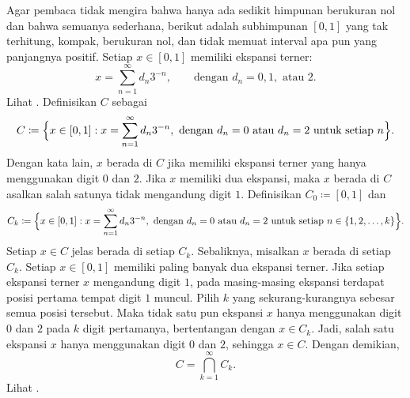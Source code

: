 \begin{example} \label{example:cantor}
Agar pembaca tidak mengira bahwa hanya ada sedikit himpunan berukuran nol dan
bahwa semuanya sederhana, berikut adalah subhimpunan $[0,1]$ yang tak
terhitung, kompak, berukuran nol, dan tidak memuat interval apa pun yang
panjangnya positif. Setiap $x\in[0,1]$ memiliki ekspansi terner:
\begin{equation*}
x = \sum_{n=1}^\infty d_n 3^{-n} ,
\qquad \text{dengan } d_n=0, 1, \text{ atau } 2.
\end{equation*}
Lihat . Definisikan
\emph{} $C$ sebagai
\begin{equation*}
C \coloneqq \Bigl\{ x \in [0,1] : x = \sum_{n=1}^\infty d_n 3^{-n},
\text{ dengan } d_n = 0 \text{ atau } d_n = 2
\text{ untuk setiap } n \Bigr\} .
\end{equation*}
Dengan kata lain, $x$ berada di $C$ jika memiliki ekspansi terner yang hanya
menggunakan digit $0$ dan $2$. Jika $x$ memiliki dua ekspansi, maka $x$ berada
di $C$ asalkan salah satunya tidak mengandung digit $1$. Definisikan
$C_0\coloneqq[0,1]$ dan
\begin{equation*}
C_k \coloneqq \Bigl\{ x \in [0,1] : x = \sum_{n=1}^\infty d_n 3^{-n},
\text{ dengan } d_n = 0 \text{ atau } d_n = 2
\text{ untuk setiap } n\in\{1,2,\ldots,k\} \Bigr\} .
\end{equation*}
Setiap $x\in C$ jelas berada di setiap $C_k$. Sebaliknya, misalkan $x$ berada
di setiap $C_k$. Setiap $x\in[0,1]$ memiliki paling banyak dua ekspansi terner.
Jika setiap ekspansi terner $x$ mengandung digit $1$, pada masing-masing
ekspansi terdapat posisi pertama tempat digit $1$ muncul. Pilih $k$ yang
sekurang-kurangnya sebesar semua posisi tersebut. Maka tidak satu pun ekspansi
$x$ hanya menggunakan digit $0$ dan $2$ pada $k$ digit pertamanya, bertentangan
dengan $x\in C_k$. Jadi, salah satu ekspansi $x$ hanya menggunakan digit $0$
dan $2$, sehingga $x\in C$. Dengan demikian,
\begin{equation*}
C = \bigcap_{k=1}^\infty C_k .
\end{equation*}
Lihat .


\end{example}
